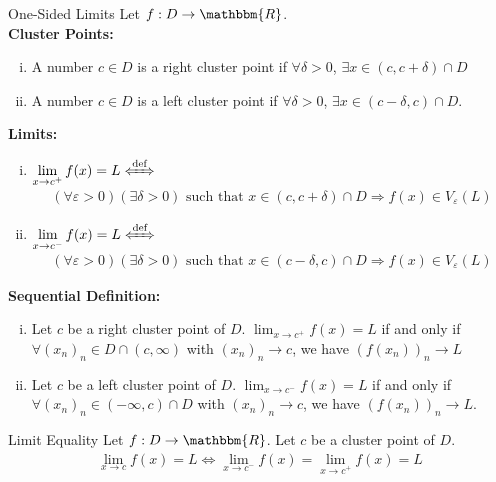 \documentclass[10pt]{extarticle}
\newcommand{\R}{\mathbbm{R}}
\begin{document}
  \begin{problem}{One-Sided Limits}
    Let $f: D\rightarrow \R$.\\
    
    \textbf{Cluster Points:}
    \begin{enumerate}[(i)]
      \item A number $c\in D$ is a right cluster point if $\forall \delta > 0$, $\exists x\in (c,c+\delta) \cap D$
      \item A number $c\in D$ is a left cluster point if $\forall \delta > 0$, $\exists x\in (c-\delta,c) \cap D$.
    \end{enumerate}
    \textbf{Limits:}
    \begin{enumerate}[(i)]
      \item $\displaystyle \lim_{x\rightarrow c^{+}} f(x) = L \xLeftrightarrow{\text{def}}$
        \begin{align*}
          (\forall \varepsilon > 0)(\exists \delta > 0) \text{ such that } x\in (c,c+\delta)\cap D \Rightarrow f(x)\in V_{\varepsilon}(L)
        \end{align*}
      \item $\displaystyle \lim_{x\rightarrow c^{-}} f(x) = L \xLeftrightarrow{\text{def}}$
        \begin{align*}
          (\forall \varepsilon > 0)(\exists \delta > 0) \text{ such that } x\in (c-\delta,c) \cap D \Rightarrow f(x)\in V_{\varepsilon}(L)
        \end{align*}
    \end{enumerate}
    \textbf{Sequential Definition:}
    \begin{enumerate}[(i)]
      \item Let $c$ be a right cluster point of $D$. $\lim_{x\rightarrow c^{+}} f(x) = L$ if and only if $\forall (x_n)_n \in D\cap (c,\infty)$ with $(x_n)_n \rightarrow c$, we have $(f(x_n))_n \rightarrow L$
      \item Let $c$ be a left cluster point of $D$. $\lim_{x\rightarrow c^{-}} f(x) = L$ if and only if $\forall (x_n)_n \in (-\infty,c) \cap D$ with $(x_n)_n \rightarrow c$, we have $(f(x_n))_n \rightarrow L$.
    \end{enumerate}
  \end{problem}
  \begin{problem}{Limit Equality}
    Let $f:D\rightarrow \R$. Let $c$ be a cluster point of $D$.
    \begin{align*}
      \lim_{x\rightarrow c}f(x) = L \Leftrightarrow \lim_{x\rightarrow c^{-}}f(x) = \lim_{x\rightarrow c^{+}}f(x) = L
    \end{align*}
  \end{problem}
\end{document}
